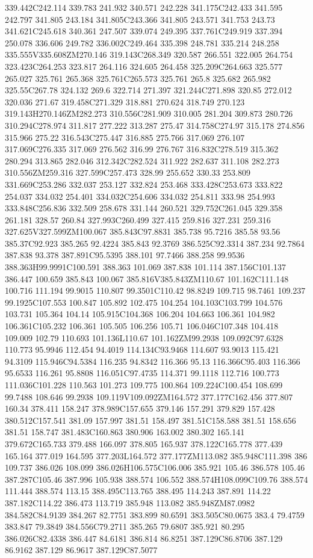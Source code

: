 339.442C242.114 339.783 241.932 340.571 242.228 341.175C242.433 341.595 242.797 341.805 243.184 341.805C243.366 341.805 243.571 341.753 243.73 341.621C245.618 340.361 247.507 339.074 249.395 337.761C249.919 337.394 250.078 336.606 249.782 336.002C249.464 335.398 248.781 335.214 248.258 335.555V335.608ZM270.146 319.143C268.349 320.587 266.551 322.005 264.754 323.423C264.253 323.817 264.116 324.605 264.458 325.209C264.663 325.577 265.027 325.761 265.368 325.761C265.573 325.761 265.8 325.682 265.982 325.55C267.78 324.132 269.6 322.714 271.397 321.244C271.898 320.85 272.012 320.036 271.67 319.458C271.329 318.881 270.624 318.749 270.123 319.143H270.146ZM282.273 310.556C281.909 310.005 281.204 309.873 280.726 310.294C278.974 311.817 277.222 313.287 275.47 314.758C274.97 315.178 274.856 315.966 275.22 316.543C275.447 316.885 275.766 317.069 276.107 317.069C276.335 317.069 276.562 316.99 276.767 316.832C278.519 315.362 280.294 313.865 282.046 312.342C282.524 311.922 282.637 311.108 282.273 310.556ZM259.316 327.599C257.473 328.99 255.652 330.33 253.809 331.669C253.286 332.037 253.127 332.824 253.468 333.428C253.673 333.822 254.037 334.032 254.401 334.032C254.606 334.032 254.811 333.98 254.993 333.848C256.836 332.509 258.678 331.144 260.521 329.752C261.045 329.358 261.181 328.57 260.84 327.993C260.499 327.415 259.816 327.231 259.316 327.625V327.599ZM100.067 385.843C97.8831 385.738 95.7216 385.58 93.56 385.37C92.923 385.265 92.4224 385.843 92.3769 386.525C92.3314 387.234 92.7864 387.838 93.378 387.891C95.5395 388.101 97.7466 388.258 99.9536 388.363H99.9991C100.591 388.363 101.069 387.838 101.114 387.156C101.137 386.447 100.659 385.843 100.067 385.816V385.843ZM110.67 101.162C111.148 100.716 111.194 99.9015 110.807 99.3501C110.42 98.8249 109.715 98.7461 109.237 99.1925C107.553 100.847 105.892 102.475 104.254 104.103C103.799 104.576 103.731 105.364 104.14 105.915C104.368 106.204 104.663 106.361 104.982 106.361C105.232 106.361 105.505 106.256 105.71 106.046C107.348 104.418 109.009 102.79 110.693 101.136L110.67 101.162ZM99.2938 109.092C97.6328 110.773 95.9946 112.454 94.4019 114.134C93.9468 114.607 93.9013 115.421 94.3109 115.946C94.5384 116.235 94.8342 116.366 95.13 116.366C95.403 116.366 95.6533 116.261 95.8808 116.051C97.4735 114.371 99.1118 112.716 100.773 111.036C101.228 110.563 101.273 109.775 100.864 109.224C100.454 108.699 99.7488 108.646 99.2938 109.119V109.092ZM164.572 377.177C162.456 377.807 160.34 378.411 158.247 378.989C157.655 379.146 157.291 379.829 157.428 380.512C157.541 381.09 157.997 381.51 158.497 381.51C158.588 381.51 158.656 381.51 158.747 381.483C160.863 380.906 163.002 380.302 165.141 379.672C165.733 379.488 166.097 378.805 165.937 378.122C165.778 377.439 165.164 377.019 164.595 377.203L164.572 377.177ZM113.082 385.948C111.398 386 109.737 386.026 108.099 386.026H106.575C106.006 385.921 105.46 386.578 105.46 387.287C105.46 387.996 105.938 388.574 106.552 388.574H108.099C109.76 388.574 111.444 388.574 113.15 388.495C113.765 388.495 114.243 387.891 114.22 387.182C114.22 386.473 113.719 385.948 113.082 385.948ZM87.0982 384.582C84.9139 384.267 82.7751 383.899 80.6591 383.505C80.0675 383.4 79.4759 383.847 79.3849 384.556C79.2711 385.265 79.6807 385.921 80.295 386.026C82.4338 386.447 84.6181 386.814 86.8251 387.129C86.8706 387.129 86.9162 387.129 86.9617 387.129C87.5077 
